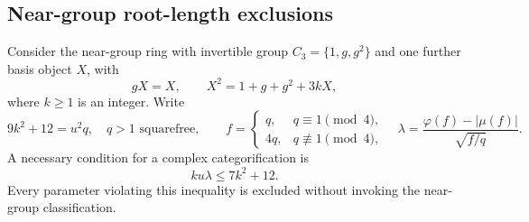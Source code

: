 \subsection{Near-group root-length exclusions}
\begin{proposition}\label{prop:near}
Consider the near-group ring with invertible group $C_3=\{1,g,g^2\}$ and one further basis object $X$, with
\[
gX=X,\qquad X^2=1+g+g^2+3kX,
\]
where $k\geq1$ is an integer. Write
\[
9k^2+12=u^2q,\quad q>1\text{ squarefree},\qquad
f=\begin{cases}q,&q\equiv1\pmod4,\\4q,&q\not\equiv1\pmod4,\end{cases}
\quad \lambda=\frac{\varphi(f)-|\mu(f)|}{\sqrt{f/q}}.
\]
A necessary condition for a complex categorification is
\begin{equation}\label{eq:near-bound}
ku\lambda\leq7k^2+12.
\end{equation}
Every parameter violating this inequality is excluded without invoking
the near-group classification.
\end{proposition}
